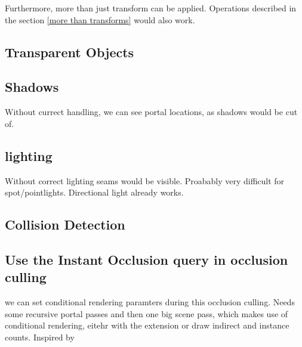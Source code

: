Furthermore, more than just transform can be applied. Operations described in the section \ref{more than transforms} would also work.

\subsection{Transparent Objects}
\subsection{Shadows}
Without currect handling, we can see portal locations, as shadows would be cut of.
\subsection{lighting}
Without correct lighting seams would be visible. Proabably very difficult for spot/pointlights. Directional light already works.
\subsection{Collision Detection}
\subsection{Use the Instant Occlusion query in occlusion culling}
we can set conditional rendering paramters during this occlusion culling.
Needs some  recursive portal passes and then one big scene pass, which makes use of conditional rendering, eitehr with the extension or draw indirect and instance counts. Inspired by \cite{yang:2014:walkthrough}












